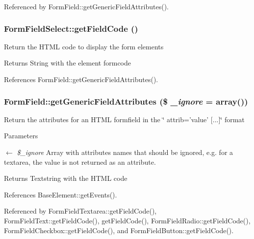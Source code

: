 Referenced by FormField::getGenericFieldAttributes().

\subsubsection[{getFieldCode}]{\setlength{\rightskip}{0pt plus 5cm}FormFieldSelect::getFieldCode ()}\label{classFormFieldSelect_ae8875a609d388b03fcc63dd9111b5458}
Return the HTML code to display the form elements

\begin{DoxyReturn}{Returns}
String with the element formcode 
\end{DoxyReturn}


References FormField::getGenericFieldAttributes().

\subsubsection[{getGenericFieldAttributes}]{\setlength{\rightskip}{0pt plus 5cm}FormField::getGenericFieldAttributes (\$ {\em \_\-ignore} = {\ttfamily array()})}\label{classFormField_a9f9d136ba8b4a793f22370aff43d592d}
Return the attributes for an HTML formfield in the \char`\"{} attrib='value' \mbox{[}...\mbox{]}\char`\"{} format


\begin{DoxyParams}{Parameters}
\item[\mbox{$\leftarrow$} {\em \$\_\-ignore}]Array with attributes names that should be ignored, e.g. for a textarea, the value is not returned as an attribute. \end{DoxyParams}
\begin{DoxyReturn}{Returns}
Textstring with the HTML code 
\end{DoxyReturn}


References BaseElement::getEvents().



Referenced by FormFieldTextarea::getFieldCode(), FormFieldText::getFieldCode(), getFieldCode(), FormFieldRadio::getFieldCode(), FormFieldCheckbox::getFieldCode(), and FormFieldButton::getFieldCode().

